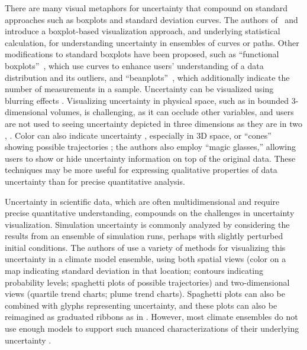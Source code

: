There are many visual metaphors for uncertainty that compound on standard approaches such as boxplots and standard deviation curves. The authors of~\cite{contourboxplot} and~\cite{curveboxplot} introduce a boxplot-based visualization approach, and underlying statistical calculation, for understanding uncertainty in ensembles of curves or paths. Other modifications to standard boxplots have been proposed, such as ``functional boxplots''~\cite{functionalboxplots}, which use curves to enhance users' understanding of a data distribution and its outliers, and ``beanplots''~\cite{beanplot}, which additionally indicate the number of measurements in a sample. Uncertainty can be visualized using blurring effects \cite{haroz:seeing}. Visualizing uncertainty in physical space, such as in bounded 3-dimensional volumes, is challenging, as it can occlude other variables, and users are not used to seeing uncertainty depicted in three dimensions as they are in two \cite{haroz:2008}, \cite{li}. Color can also indicate uncertainty \cite{potter:2009}, especially in 3D space, or ``cones'' showing possible trajectories \cite{li}; the authors also employ ``magic glasses,'' allowing users to show or hide uncertainty information on top of the original data. These techniques may be more useful for expressing qualitative properties of data uncertainty than for precise quantitative analysis.

Uncertainty in scientific data, which are often multidimensional and require precise quantitative understanding, compounds on the challenges in uncertainty visualization. Simulation uncertainty is commonly analyzed by considering the results from an ensemble of simulation runs, perhaps with slightly perturbed initial conditions. The authors of \cite{potter:2009} use a variety of methods for visualizing this uncertainty in a climate model ensemble, using both spatial views (color on a map indicating standard deviation in that location; contours indicating probability levels; spaghetti plots of possible trajectories) and two-dimensional views (quartile trend charts; plume trend charts). Spaghetti plots can also be combined with glyphs representing uncertainty, and these plots can also be reimagined as graduated ribbons as in \cite{sanyal}. However, most climate ensembles do not use enough models to support such nuanced characterizations of their underlying uncertainty \cite{potter:2009}.


